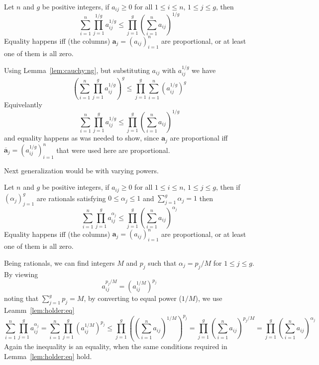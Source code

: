 \begin{lem} \label{lem:holder:eq}
Let $n$ and $g$ be positive integers,
if \(a_{ij}\geq 0\)
for all \(1\leq i \leq n\), \(1\leq j \leq g\),
then
\begin{equation}
 \sum_{i=1}^n \prod_{j=1}^{1/g} a_{ij}^{1/g}
 \leq
 \prod_{j=1}^g \left(\sum_{i=1}^n a_{ij}\right)^{1/g}
\end{equation}
Equality happens iff (the columns)
\(\mathbf{a}_j = (a_{ij})_{i=1}^n\) are proportional, or at least
one of them is all zero.
\end{lem}
\begin{thmproof}
Using Lemma~\ref{lem:cauchy:ng},
but substituting \(a_{ij}\) with \(a_{ij}^{1/g}\)
we have
\begin{equation*}
 \left(\sum_{i=1}^n \prod_{j=1}^g a_{ij}^{1/g}\right)^g
 \leq
 \prod_{j=1}^g \sum_{i=1}^n (a_{ij}^{1/g})^g
\end{equation*}
Equivelantly
\begin{equation*}
 \sum_{i=1}^n \prod_{j=1}^g a_{ij}^{1/g}
 \leq
 \prod_{j=1}^g \left(\sum_{i=1}^n a_{ij}\right)^{1/g}
\end{equation*}
and equality happens as was needed to show, since \(\mathbf{a}_j\)
are proportional iff \(\overline{\mathbf{a}}_j = (a_{ij}^{1/g})_{i=1}^n\)
that were used here are proportional.
\end{thmproof}


Next generalization would be with varying powers.
\begin{lem} \label{lem:holder:rat}
Let $n$ and $g$ be positive integers,
if \(a_{ij}\geq 0\)
for all \(1\leq i \leq n\), \(1\leq j \leq g\),
then
if \((\alpha_j)_{j=1}^g\) are rationals satisfying \(0\leq \alpha_j \leq 1\)
and \(\sum_{j=1}^g \alpha_j = 1\) then
\begin{equation}
 \sum_{i=1}^n \prod_{j=1}^g a_{ij}^{\alpha_j}
 \leq
 \prod_{j=1}^g \left(\sum_{i=1}^n a_{ij}\right)^{\alpha_j}
\end{equation}
Equality happens iff (the columns)
\(\mathbf{a}_j = (a_{ij})_{i=1}^n\) are proportional, or at least
one of them is all zero.
\end{lem}
\begin{thmproof}
Being rationals, we can find integers $M$ and \(p_j\) such that
\(\alpha_j = p_j/M\) for \(1\leq j \leq g\).
By viewing
\begin{equation*}
a_{ij}^{p_j/M} = \left(a_{ij}^{1/M}\right)^{p_j}
\end{equation*}
noting that \(\sum_{j=1}^g p_j = M\),
by converting to equal power (\(1/M\)),
we use Leamm~\ref{lem:holder:eq}
\begin{equation*}
     \sum_{i=1}^n \prod_{j=1}^g a_{ij}^{\alpha_j}
 =   \sum_{i=1}^n \prod_{j=1}^g \left(a_{ij}^{1/M}\right)^{p_j}
\leq \prod_{j=1}^g \left(\left(\sum_{i=1}^n a_{ij}\right)^{1/M}\right)^{p_j}
=    \prod_{j=1}^g \left(\sum_{i=1}^n a_{ij}\right)^{p_j/M}
=    \prod_{j=1}^g \left(\sum_{i=1}^n a_{ij}\right)^{\alpha_j}
\end{equation*}
Again the inequality is an equality, when the same conditions
required in Lemma~\ref{lem:holder:eq} hold.
\end{thmproof}

